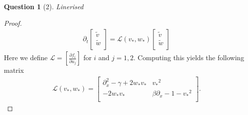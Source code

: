 \documentclass[11pt]{article}
\theoremstyle{quest}
\newtheorem*{question}{Question}
\newcommand{\Dp}{\partial}
\begin{document}
\begin{question}[2]
    Linerised 
\end{question}
\begin{proof}
    \begin{align*}
        \Dp_t
        \begin{bmatrix}
            \tilde{v} \\
            \tilde{w} \\
        \end{bmatrix}  = 
        \mathcal{L} \left( v_*, w_* \right)
        \begin{bmatrix}
            \tilde{v} \\
            \tilde{w} \\
        \end{bmatrix}   
    \end{align*}
    Here we define $\mathcal{L} = \left[ \frac{\Dp f_i }{ \Dp u_j } \right]$ for $i$ and $j=1,2$. 
    Computing this yields the following matrix 
    \begin{align*}
        \mathcal{L} \left( v_*, w_* \right)  =
        \begin{bmatrix}
            \Dp_{x}^{2} - \gamma + 2 w_* v_* & {v_*}^2 \\
            -2w_* v_* & \beta \Dp_x -1 - {v_*}^2 \\
        \end{bmatrix}
        .
    \end{align*}
\end{proof}
\end{document}
